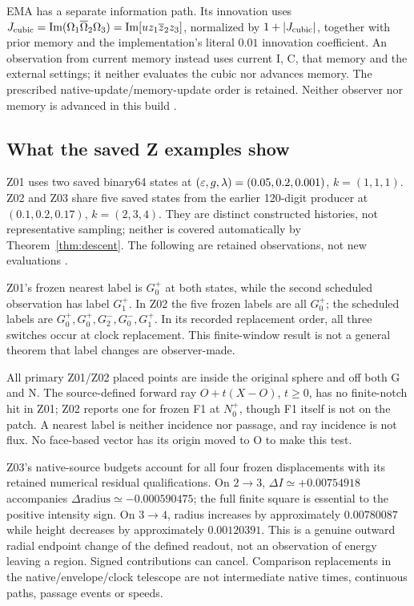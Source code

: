 EMA has a separate information path. Its innovation uses
$J_{\rm cubic}=\operatorname{Im}(\Omega_1\overline\Omega_2\Omega_3)
=\operatorname{Im}[u z_1\overline z_2z_3]$, normalized by $1+|J_{\rm cubic}|$, together with prior memory and the implementation's literal $0.01$ innovation coefficient. An observation from current memory instead uses current I, C, that memory and the external settings; it neither evaluates the cubic nor advances memory. The prescribed native-update/memory-update order is retained. Neither observer nor memory is advanced in this build \cite{phase,zmethods}.

\subsection{What the saved Z examples show}
Z01 uses two saved binary64 states at $(\varepsilon,g,\lambda)=(0.05,0.2,0.001)$, $k=(1,1,1)$. Z02 and Z03 share five saved states from the earlier 120-digit producer at $(0.1,0.2,0.17)$, $k=(2,3,4)$. They are distinct constructed histories, not representative sampling; neither is covered automatically by Theorem~\ref{thm:descent}. The following are retained observations, not new evaluations \cite{zmethods,assessment}.

Z01's frozen nearest label is $G_0^+$ at both states, while the second scheduled observation has label $G_1^+$. In Z02 the five frozen labels are all $G_0^+$; the scheduled labels are $G_0^+,G_0^+,G_2^-,G_0^-,G_1^+$. In its recorded replacement order, all three switches occur at clock replacement. This finite-window result is not a general theorem that label changes are observer-made.

All primary Z01/Z02 placed points are inside the original sphere and off both G and N. The source-defined forward ray $O+t(X-O)$, $t\ge0$, has no finite-notch hit in Z01; Z02 reports one for frozen F1 at $N_0^+$, though F1 itself is not on the patch. A nearest label is neither incidence nor passage, and ray incidence is not flux. No face-based vector has its origin moved to O to make this test.

Z03's native-source budgets account for all four frozen displacements with its retained numerical residual qualifications. On $2\to3$, $\Delta I\simeq+0.00754918$ accompanies $\Delta\text{radius}\simeq-0.000590475$; the full finite square is essential to the positive intensity sign. On $3\to4$, radius increases by approximately $0.00780087$ while height decreases by approximately $0.00120391$. This is a genuine outward radial endpoint change of the defined readout, not an observation of energy leaving a region. Signed contributions can cancel. Comparison replacements in the native/envelope/clock telescope are not intermediate native times, continuous paths, passage events or speeds.
